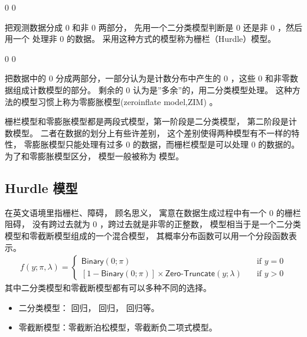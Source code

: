 \documentclass[letterpaper,10pt,english]{sphinxmanual}
\begin{document}
\(0\)  \(0\)

把观测数据分成 \(0\) 和非 \(0\) 两部分，
先用一个二分类模型判断是 \(0\) 还是非 \(0\)
，然后用一个  处理非 \(0\) 的数据。
采用这种方式的模型称为栅栏（Hurdle）模型。

 \(0\)  \(0\)

把数据中的 \(0\) 分成两部分，一部分认为是计数分布中产生的 \(0\)
，这些 \(0\) 和非零数据组成计数模型的部分。
剩余的 \(0\) 认为是”多余”的，用二分类模型处理。
这种方法的模型习惯上称为零膨胀模型(zero\sphinxhyphen{}inflate model,ZIM)
。

栅栏模型和零膨胀模型都是两段式模型，第一阶段是二分类模型，
第二阶段是计数模型。
二者在数据的划分上有些许差别，
这个差别使得两种模型有不一样的特性，
零膨胀模型只能处理有过多 \(0\)
的数据，而栅栏模型是可以处理 \(0\)  的数据的。
为了和零膨胀模型区分， 模型一般被称为 
模型。


\subsection{Hurdle 模型}
\label{\detokenize{_u96f6_u8ba1_u6570_u95ee_u9898/content:hurdle}}
 在英文语境里指栅栏、障碍，
顾名思义， 寓意在数据生成过程中有一个 \(0\) 的栅栏阻碍，
没有跨过去就为 \(0\) ，跨过去就是非零的正整数，
 模型相当于是一个二分类模型和零截断模型组成的一个混合模型，
其概率分布函数可以用一个分段函数表示。
\begin{equation}\label{equation:零计数问题/content:eq_zero_counts_030}
\begin{split}f(y ; \pi,\lambda)
=
\begin{cases}
\textsf{Binary}(0 ; \pi) &\quad \text{if } y = 0\\
\left [1-\textsf{Binary}(0 ; \pi) \right ]
\times
 \textsf{Zero-Truncate}(y;\lambda)
&\quad\text{if } y > 0
\end{cases}\end{split}
\end{equation}
其中二分类模型和零截断模型都有可以多种不同的选择。
\begin{itemize}
\item {} 
二分类模型： 回归，  回归，  回归等。

\item {} 
零截断模型：零截断泊松模型，零截断负二项式模型。

\end{itemize}
\end{document}
